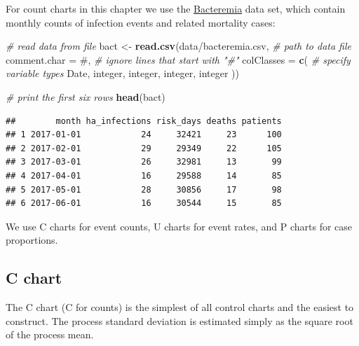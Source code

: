 \documentclass[
]{book}
\newenvironment{Shaded}{\begin{snugshade}}{\end{snugshade}}
\newcommand{\AttributeTok}[1]{\textcolor[rgb]{0.13,0.29,0.53}{#1}}
\newcommand{\CommentTok}[1]{\textcolor[rgb]{0.56,0.35,0.01}{\textit{#1}}}
\newcommand{\FunctionTok}[1]{\textcolor[rgb]{0.13,0.29,0.53}{\textbf{#1}}}
\newcommand{\NormalTok}[1]{#1}
\newcommand{\OtherTok}[1]{\textcolor[rgb]{0.56,0.35,0.01}{#1}}
\newcommand{\StringTok}[1]{\textcolor[rgb]{0.31,0.60,0.02}{#1}}
\begin{document}
For count charts in this chapter we use the \hyperref[bacteremia]{Bacteremia} data set, which contain monthly counts of infection events and related mortality cases:

\begin{Shaded}
\begin{Highlighting}[]
\CommentTok{\# read data from file}
\NormalTok{bact }\OtherTok{\textless{}{-}} \FunctionTok{read.csv}\NormalTok{(}\StringTok{\textquotesingle{}data/bacteremia.csv\textquotesingle{}}\NormalTok{,  }\CommentTok{\# path to data file}
                 \AttributeTok{comment.char =} \StringTok{\textquotesingle{}\#\textquotesingle{}}\NormalTok{,     }\CommentTok{\# ignore lines that start with "\#"}
                 \AttributeTok{colClasses   =} \FunctionTok{c}\NormalTok{(       }\CommentTok{\# specify variable types}
                   \StringTok{\textquotesingle{}Date\textquotesingle{}}\NormalTok{,}
                   \StringTok{\textquotesingle{}integer\textquotesingle{}}\NormalTok{,}
                   \StringTok{\textquotesingle{}integer\textquotesingle{}}\NormalTok{,}
                   \StringTok{\textquotesingle{}integer\textquotesingle{}}\NormalTok{,}
                   \StringTok{\textquotesingle{}integer\textquotesingle{}}
\NormalTok{                 ))}

\CommentTok{\# print the first six rows}
\FunctionTok{head}\NormalTok{(bact)}
\end{Highlighting}
\end{Shaded}

\begin{verbatim}
##        month ha_infections risk_days deaths patients
## 1 2017-01-01            24     32421     23      100
## 2 2017-02-01            29     29349     22      105
## 3 2017-03-01            26     32981     13       99
## 4 2017-04-01            16     29588     14       85
## 5 2017-05-01            28     30856     17       98
## 6 2017-06-01            16     30544     15       85
\end{verbatim}

We use C charts for event counts, U charts for event rates, and P charts for case proportions.

\subsection{C chart}\label{c-chart}

The C chart (C for counts) is the simplest of all control charts and the easiest to construct. The process standard deviation is estimated simply as the square root of the process mean.
\end{document}
